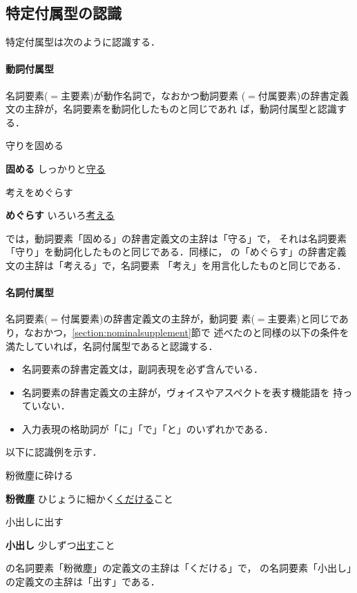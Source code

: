 \documentclass{nlp}
\begin{document}
\subsection{特定付属型の認識}
特定付属型は次のように認識する．

\paragraph{動詞付属型}名詞要素($=$主要素)が動作名詞で，なおかつ動詞要素
($=$付属要素)の辞書定義文の主辞が，名詞要素を動詞化したものと同じであれ
ば，動詞付属型と認識する．
\begin{example}
 \item 守りを固める
 
 {\bf 固める} \hspace{10pt}しっかりと\underline{守る} 
 
 \item 考えをめぐらす
 
 {\bf めぐらす} \hspace{10pt}いろいろ\underline{考える} 
\end{example}
では，動詞要素「固める」の辞書定義文の主辞は「守る」で，
それは名詞要素「守り」を動詞化したものと同じである．同様に，
の「めぐらす」の辞書定義文の主辞は「考える」で，名詞要素
「考え」を用言化したものと同じである．


\paragraph{名詞付属型}名詞要素($=$付属要素)の辞書定義文の主辞が，動詞要
素($=$主要素)と同じであり，なおかつ，\ref{section:nominalsupplement}節で
述べたのと同様の以下の条件を満たしていれば，名詞付属型であると認識する．
\begin{itemize}
 \item 名詞要素の辞書定義文は，副詞表現を必ず含んでいる．
 \item 名詞要素の辞書定義文の主辞が，ヴォイスやアスペクトを表す機能語を
       持っていない．
 \item 入力表現の格助詞が「に」「で」「と」のいずれかである．
\end{itemize}
以下に認識例を示す．
\begin{example}
 \item 粉微塵に砕ける

 {\bf 粉微塵} \hspace{10pt}ひじょうに細かく\underline{くだける}こと

 \item 小出しに出す

 {\bf 小出し} \hspace{10pt}少しずつ\underline{出す}こと
\end{example}
の名詞要素「粉微塵」の定義文の主辞は「くだける」で，
の名詞要素「小出し」の定義文の主辞は「出す」である．
\end{document}
